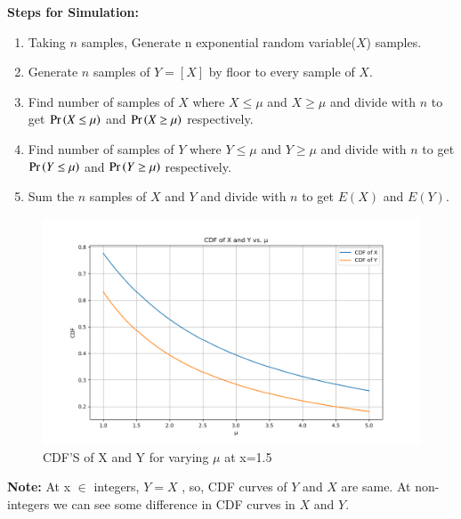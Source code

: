 \documentclass[journal,12pt,twocolumn]{IEEEtran}
\theoremstyle{remark}
\begin{document}
\textbf{Steps for Simulation:}
\begin{enumerate}
\item Taking $n$ samples, Generate n exponential random variable($X$) samples.
\item Generate $n$ samples of $Y=[X]$ by floor to every sample of $X$.
\item Find number of samples of $X$ where $X \leq \mu$ and $X \geq \mu$ and divide with $n$ to get $\Pr\left(X \leq \mu\right)$ and $\Pr\left(X \geq \mu\right)$ respectively.
\item Find number of samples of $Y$ where $Y \leq \mu$ and $Y \geq \mu$ and divide with $n$ to get $\Pr\left(Y \leq \mu\right)$ and $\Pr\left(Y \geq \mu\right)$ respectively.
\item Sum the $n$ samples of $X$ and $Y$ and divide with $n$ to get $E(X)$ and $E(Y)$.
\end{enumerate}
\begin{figure}[!ht]
\centering
\includegraphics[width=\columnwidth]{figs/figure.png}
\caption{CDF'S of X and Y for varying $\mu$ at x=1.5}
\end{figure}
\textbf{Note:}
At x $\in$ integers, $Y=X$ , so, CDF curves of $Y$ and $X$ are same. At non-integers we can see some difference in CDF curves in $X$ and $Y$.
\end{document}
